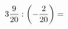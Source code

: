 \documentclass[preview]{standalone}
\begin{document}
\begin{align*}
3 { 9 \over 20 }  :  \left( - { 2 \over 20 } \right)  =
\end{align*}
\end{document}
